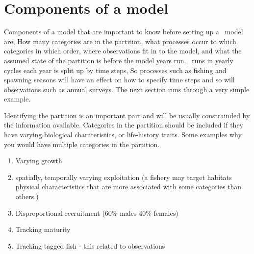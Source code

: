 \section{Components of a model}\label{Sec:comp}

Components of a model that are important to know before setting up a \CNAME\ model are, How many categories are in the partition, what processes occur to which categories in which order, where observations fit in to the model, and what the assumed state of the partition is before the model years run. \CNAME\ runs in yearly cycles each year is split up by time steps, So processes such as fishing and spawning seasons will have an effect on how to specify time steps and so will observations such as annual surveys. The next section runs through a very simple example.

Identifying the partition is an important part and will be usually constrainded by the information available. Categories in the partition should be included if they have varying biological charateristics, or life-history traits. Some examples why you would have multiple categories in the partition.

\begin{enumerate}
	\item Varying growth
	\item spatially, temporally varying exploitation (a fishery may target habitats physical characteristics that are more associated with some categories than others.)
	\item Disproportional recruitment (60\% males 40\% females)
	\item Tracking maturity
	\item Tracking tagged fish - this related to observations
\end{enumerate}

